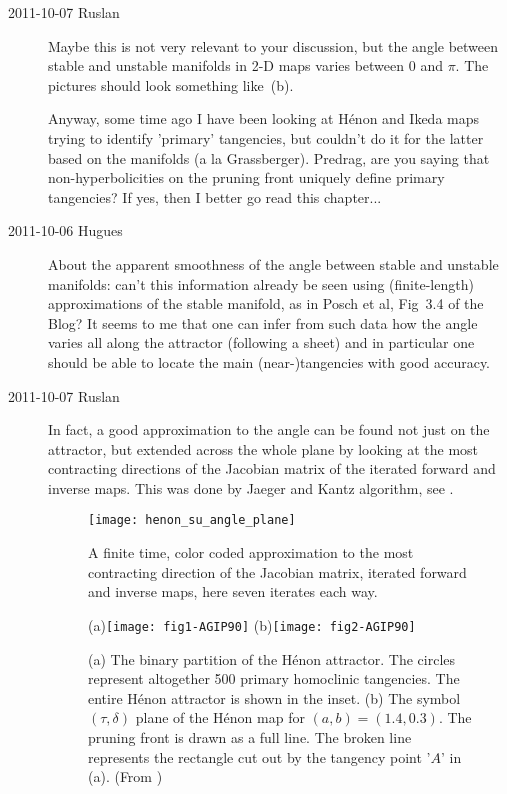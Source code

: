 \begin{description}
\item[2011-10-07 Ruslan] Maybe this is not very relevant to your
discussion, but the angle between stable and unstable manifolds in 2-D
maps varies between $0$ and $\pi$.  The pictures should look something
like \,(b).

Anyway, some time ago I have been looking at H\'enon and Ikeda
maps trying to identify 'primary' tangencies, but couldn't do it
for the latter based on the manifolds (a la Grassberger). Predrag,
are you saying that non-hyperbolicities on the pruning front
uniquely define primary tangencies?  If yes, then I better go read
this chapter...

\item[2011-10-06 Hugues]
About the apparent smoothness of the angle between stable and unstable
manifolds: can't this information already be seen using (finite-length)
approximations of the stable manifold, as in Posch et al, Fig~3.4 of the
Blog? It seems to me that one can infer from such data how the angle
varies all along the attractor (following a sheet) and in particular one
should be able to locate the main (near-)tangencies with good accuracy.

\item[2011-10-07 Ruslan] In fact, a good approximation to the angle can
be found not just on the attractor, but extended across the whole plane
by looking at the most contracting directions of the Jacobian matrix of
the iterated forward and inverse maps.  This was done by Jaeger and Kantz
algorithm, see .

\begin{figure}
\texttt{[image: henon\_su\_angle\_plane]}
\caption{
A finite time, color coded approximation to the most contracting
direction of the Jacobian matrix, iterated forward and inverse
maps, here seven iterates each way.
}
\label{fig:henon_su_angle_plane}
\end{figure}

\begin{figure}
(a)\texttt{[image: fig1-AGIP90]}
(b)\texttt{[image: fig2-AGIP90]}
\caption{
(a)
The binary partition of the H\'enon attractor. The circles represent
altogether 500 primary homoclinic tangencies. The entire H\'enon
attractor is shown in the inset.
(b)
The symbol $(\tau,\delta)$ plane of the H\'enon map for $(a, b) = (1.4,
0.3)$. The pruning front is drawn as a full line. The broken line
represents the rectangle cut out by the tangency point '$A$' in (a).
(From )
}
\label{fig1-2-AGIP90}
\end{figure}


\end{description}
